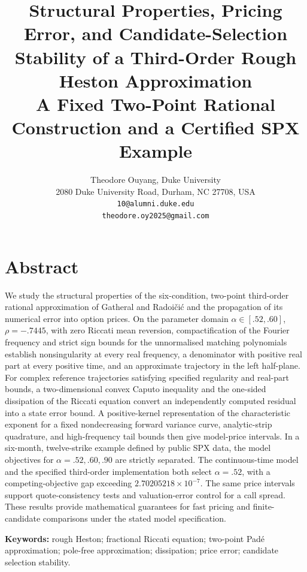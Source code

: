 \documentclass[a4paper,11pt]{article}
\begin{document}
\title{Structural Properties, Pricing Error, and Candidate-Selection Stability of a Third-Order Rough Heston Approximation\\[5pt]\large A Fixed Two-Point Rational Construction and a Certified SPX Example}
\author{Theodore Ouyang, Duke University\\\small 2080 Duke University Road, Durham, NC 27708, USA\\\texttt{10@alumni.duke.edu}\\\texttt{theodore.oy2025@gmail.com}}
\date{}
\maketitle

\section*{Abstract}

We study the structural properties of the six-condition, two-point third-order rational approximation of Gatheral and Radoičić and the propagation of its numerical error into option prices. On the parameter domain \(\alpha\in[.52,.60]\), \(\rho=-.7445\), with zero Riccati mean reversion, compactification of the Fourier frequency and strict sign bounds for the unnormalised matching polynomials establish nonsingularity at every real frequency, a denominator with positive real part at every positive time, and an approximate trajectory in the left half-plane. For complex reference trajectories satisfying specified regularity and real-part bounds, a two-dimensional convex Caputo inequality and the one-sided dissipation of the Riccati equation convert an independently computed residual into a state error bound. A positive-kernel representation of the characteristic exponent for a fixed nondecreasing forward variance curve, analytic-strip quadrature, and high-frequency tail bounds then give model-price intervals. In a six-month, twelve-strike example defined by public SPX data, the model objectives for \(\alpha=.52,.60,.90\) are strictly separated. The continuous-time model and the specified third-order implementation both select \(\alpha=.52\), with a competing-objective gap exceeding \(2.70205218\times10^{-7}\). The same price intervals support quote-consistency tests and valuation-error control for a call spread. These results provide mathematical guarantees for fast pricing and finite-candidate comparisons under the stated model specification.

\textbf{Keywords:} rough Heston; fractional Riccati equation; two-point Padé approximation; pole-free approximation; dissipation; price error; candidate selection stability.
\end{document}
